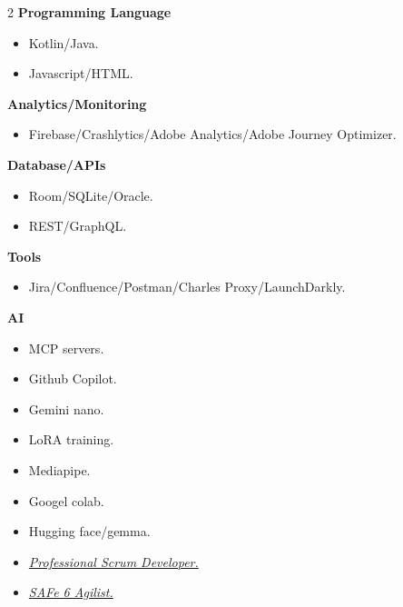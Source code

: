\documentclass[10pt,a4paper,withhyper]{altacv}
\begin{document}
\begin{paracol}{2}
\textbf{Programming Language}

\begin{itemize}
	\item Kotlin/Java.
	\item Javascript/HTML.
\end{itemize}
\divider

\textbf{Analytics/Monitoring}

\begin{itemize}
	\item Firebase/Crashlytics/Adobe Analytics/Adobe Journey Optimizer.
\end{itemize}
\divider

\textbf{Database/APIs}

\begin{itemize}
	\item Room/SQLite/Oracle.
	\item REST/GraphQL.
\end{itemize}
\divider

\textbf{Tools}

\begin{itemize}
	\item Jira/Confluence/Postman/Charles Proxy/LaunchDarkly.
\end{itemize}
\divider

\textbf{AI}

\begin{itemize}
	\item MCP servers.
	\item Github Copilot.
	\item Gemini nano.
	\item LoRA training.
	\item Mediapipe.
		\item Googel colab.
	\item Hugging face/gemma.
\end{itemize}




\divider

\divider




\begin{itemize}
\item \href{https://www.scrum.org/user/418540}{\textit{Professional Scrum Developer.}}
\item \href{https://drive.google.com/file/d/1NZk4r5TWXaY0Wp3Xjmo-ku7Hr-xPkmTo/view?usp=sharing}{\textit{SAFe 6 Agilist.}}
\end{itemize}


\end{paracol}
\end{document}
